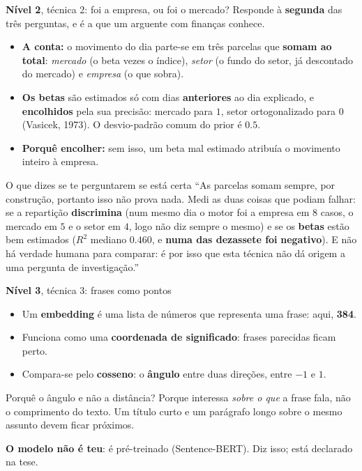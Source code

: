 \documentclass[aspectratio=169]{beamer}
\newcommand{\key}[1]{\textbf{\textcolor{blue!55!black}{#1}}}
\begin{document}
\begin{frame}{\key{Nível 2}, técnica 2: foi a empresa, ou foi o mercado?}
\small
Responde à \key{segunda} das três perguntas, e é a que um arguente com finanças conhece.
\vspace{2mm}
\begin{itemize}
  \item \key{A conta:} o movimento do dia parte-se em três parcelas que \textbf{somam ao}
        \textbf{total}: \emph{mercado} (o beta vezes o índice), \emph{setor} (o fundo do setor,
        já descontado do mercado) e \emph{empresa} (o que sobra).
  \item \key{Os betas} são estimados só com dias \textbf{anteriores} ao dia explicado, e
        \textbf{encolhidos} pela sua precisão: mercado para $1$, setor ortogonalizado para $0$
        (Vasicek, 1973). O desvio-padrão comum do prior é $0.5$.
  \item \key{Porquê encolher:} sem isso, um beta mal estimado atribuía o movimento inteiro à
        empresa.
\end{itemize}
\vspace{2mm}
\begin{block}{O que dizes se te perguntarem se está certa}
``As parcelas somam sempre, por construção, portanto isso não prova nada. Medi as duas coisas
que podiam falhar: se a repartição \textbf{discrimina} (num mesmo dia o motor foi a empresa em
$8$ casos, o mercado em $5$ e o setor em $4$, logo não diz sempre o mesmo) e se os
\textbf{betas} estão bem estimados ($R^2$ mediano $0.460$, e \textbf{numa das dezassete foi}
\textbf{negativo}). E não há verdade humana para comparar: é por isso que esta
técnica não dá origem a uma pergunta de investigação.''
\end{block}
\end{frame}

\begin{frame}{\key{Nível 3}, técnica 3: frases como pontos}
\begin{itemize}
  \item Um \key{embedding} é uma lista de números que representa uma frase: aqui, \textbf{384}.
  \item Funciona como uma \textbf{coordenada de significado}: frases parecidas ficam perto.
  \item Compara-se pelo \key{cosseno}: o \textbf{ângulo} entre duas direções, entre $-1$ e $1$.
\end{itemize}
\vspace{3mm}
\begin{block}{Porquê o ângulo e não a distância?}
Porque interessa \emph{sobre o que} a frase fala, não o comprimento do texto. Um título curto e
um parágrafo longo sobre o mesmo assunto devem ficar próximos.
\end{block}
\vspace{2mm}
\footnotesize
\key{O modelo não é teu}: é pré-treinado (Sentence-BERT). Diz isso; está declarado na tese.
\end{frame}
\end{document}
